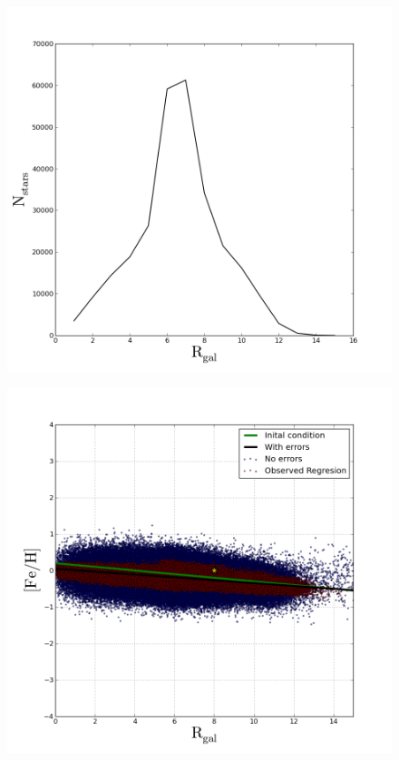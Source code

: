 \documentclass[proceedings, preprint]{rmaa}
\begin{document}
\begin{figure}
\includegraphics[scale=0.3]{histRealandobs.png}
\end{figure}

\begin{figure}
\includegraphics[scale=0.3]{ObsZandreal.png}
\end{figure} 
\end{document}
